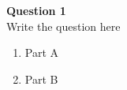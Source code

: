 \documentclass[11pt]{article}
\newcommand{\question}[2]{\begin{framed}\noindent \textbf{Question #1}\\ #2\end{framed}}
\begin{document}
\question{1}{Write the question here\vspace{-3mm}\begin{enumerate}[label=(\alph*)]\setlength{\itemsep}{0pt}\setlength{\parskip}{0pt}
  \item Part A
  \item Part B
  \end{enumerate}\vspace{-3mm}
}
\end{document}
